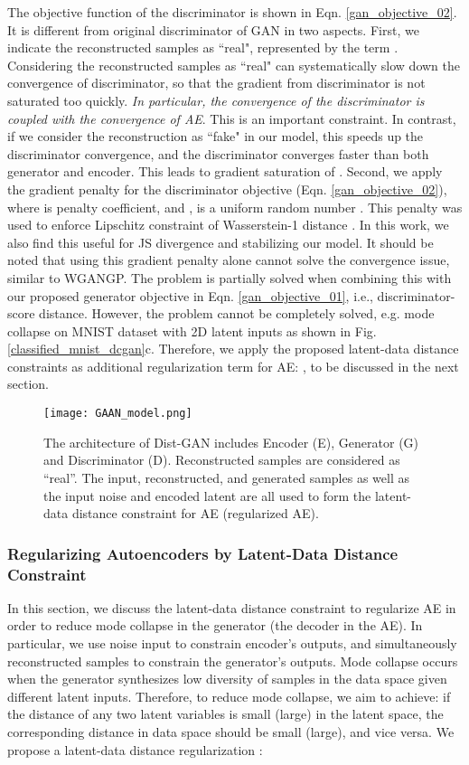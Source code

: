 \documentclass[runningheads]{llncs}
\newcommand*{\eg}{e.g. }
\begin{document}
The objective function of the discriminator is shown in Eqn. \ref{gan_objective_02}. It is different from original discriminator of GAN in two aspects. First, we indicate the reconstructed samples as ``real", represented by the term . Considering the reconstructed samples as ``real" can  systematically slow down the convergence of discriminator, so that the gradient from discriminator is not saturated too quickly. {\em In particular, the convergence of the discriminator is coupled with the convergence of AE}. This is  an important constraint. In contrast, if we consider the reconstruction as ``fake" in our model, this speeds up the discriminator convergence, and the discriminator converges faster than both generator and encoder. This leads to gradient saturation of . 
Second, we apply the gradient penalty  for the discriminator objective (Eqn. \ref{gan_objective_02}), where  is penalty coefficient, and ,  is a uniform random number . This penalty was used to enforce Lipschitz constraint of Wasserstein-1 distance \cite{gulrajani-arxiv-2017}. In this work, we also find this useful for JS divergence and stabilizing our model. It should be noted that  using this gradient penalty alone 
cannot solve the convergence issue, similar to WGANGP. The problem is partially solved when combining this with our proposed generator objective in Eqn. \ref{gan_objective_01}, i.e., discriminator-score distance. However, the problem cannot be completely solved,  \eg mode collapse on MNIST dataset with 2D latent inputs as shown in Fig. \ref{classified_mnist_dcgan}c. Therefore, we apply the proposed latent-data distance constraints as additional regularization term for AE:  , to be discussed in the next section.

\begin{figure}[t]
\centering
\texttt{[image: GAAN\_model.png]}
\caption{The architecture of Dist-GAN includes Encoder (E), Generator (G) and Discriminator (D). Reconstructed samples are considered as ``real''. The input, reconstructed, and generated samples as well as the input noise and encoded latent are all used to form the latent-data distance constraint for AE (regularized AE).}
\label{architecture-diagram}
\end{figure}


\subsubsection{Regularizing Autoencoders by Latent-Data Distance Constraint}
In this section, we discuss the latent-data distance constraint  to regularize AE in order to reduce mode collapse in the generator (the decoder in the AE).
In particular, we use noise input to constrain encoder's outputs, and simultaneously reconstructed samples to constrain the generator's outputs. Mode collapse occurs when the generator synthesizes  low diversity of samples in the data space given different latent inputs. Therefore, to reduce mode collapse, we aim to achieve:  if the distance of any two latent variables  is small (large) in the latent space, the corresponding distance  in data space should be small (large), and vice versa. We propose a latent-data distance regularization : 
\end{document}
